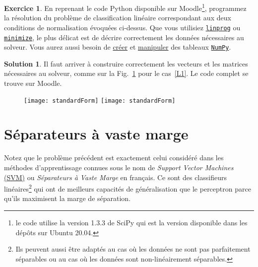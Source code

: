 \documentclass[a4paper,francais]{article}
\theoremstyle{definition}
\newtheorem{exercice}{Exercice}[section]
\newtheorem*{solution}{Solution}
\begin{document}
\begin{exercice}
  En reprenant le code Python disponible sur Moodle\footnote{
    le code utilise la version 1.3.3 de SciPy qui est la version
    disponible dans les dépôts sur Ubuntu 20.04.}, programmez la résolution du problème
  de classification linéaire correspondant aux deux conditions de normalisation évoquées
  ci-dessus.
  Que vous utilisiez 
  \href{https://docs.scipy.org/doc/scipy-1.3.3/reference/generated/scipy.optimize.linprog.html#scipy.optimize.linprog}{\texttt{linprog}} ou
  \href{https://docs.scipy.org/doc/scipy-1.3.3/reference/generated/scipy.optimize.minimize.html}{\texttt{minimize}},
  le plus délicat est de décrire correctement les données nécessaires au solveur.
  Vous aurez aussi besoin de
  \href{https://docs.scipy.org/doc/numpy/reference/routines.array-creation.html}{créer} et
  \href{https://docs.scipy.org/doc/numpy/reference/routines.array-manipulation.html}{manipuler} des
  tableaux
  \href{https://numpy.org/doc/stable/contents.html#numpy-docs-mainpage}{\texttt{NumPy}}. 
\end{exercice}

\begin{solution}
  Il faut arriver à construire correctement les vecteurs et les matrices nécessaires
  au solveur, comme sur la Fig.~\ref{fig:stdForm} pour le cas~\ref{L1}. Le code complet
  se trouve sur Moodle.  
  
  \begin{figure}[htbp]
  \centering
  \texttt{[image: standardForm]}
  \texttt{[image: standardForm]}
  \caption{}
  \label{fig:stdForm}
  \end{figure}
\end{solution}

\section{Séparateurs à vaste marge}
\label{sec:svm}

Notez que le problème précédent est exactement celui considéré dans les
méthodes d'apprentissage connues sous le nom de \emph{Support Vector Machines}
\href{https://en.wikipedia.org/wiki/Support-vector_machine}{(SVM)} ou
\emph{Séparateurs à Vaste Marge} en français. Ce sont des classifieurs
linéaires\footnote{Ils peuvent aussi être adaptés au cas où les données
  ne sont pas parfaitement séparables ou au cas où les données sont
  non-linéairement séparables.} 
qui ont de meilleurs capacités de généralisation que le perceptron 
parce qu'ils maximisent la marge de séparation.
\end{document}
